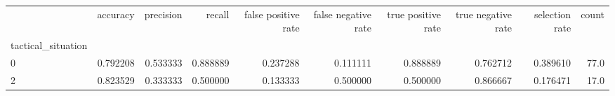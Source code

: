 \begin{tabular}{lrrrrrrrrr}
\toprule
{} &  accuracy &  precision &    recall &  false positive rate &  false negative rate &  true positive rate &  true negative rate &  selection rate &  count \\
tactical\_situation &           &            &           &                      &                      &                     &                     &                 &        \\
\midrule
0                  &  0.792208 &   0.533333 &  0.888889 &             0.237288 &             0.111111 &            0.888889 &            0.762712 &        0.389610 &   77.0 \\
2                  &  0.823529 &   0.333333 &  0.500000 &             0.133333 &             0.500000 &            0.500000 &            0.866667 &        0.176471 &   17.0 \\
\bottomrule
\end{tabular}
